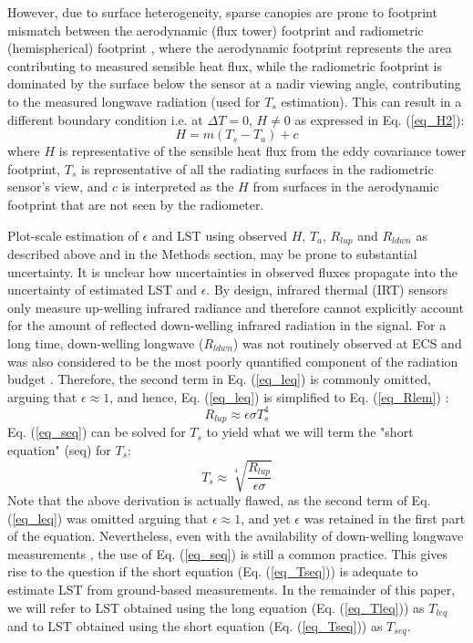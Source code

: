 \documentclass[fleqn,10pt]{wlscirep}
\begin{document}
However, due to surface heterogeneity, sparse canopies are prone to footprint mismatch between the aerodynamic (flux tower) footprint and radiometric (hemispherical) footprint \cite{chu2021representativeness,marcolla2018geometry,morillas2013using}, where the aerodynamic footprint represents the area contributing to measured sensible heat flux, while the radiometric footprint is dominated by the surface below the sensor at a nadir viewing angle, contributing to the measured longwave radiation (used for $T_{s}$ estimation). This can result in a different boundary condition i.e. at $\Delta T =0$, $H \not= 0$ as expressed in Eq. (\ref{eq_H2}): 
\begin{equation}\label{eq_H2}
H= m(T_{s} - T_{a}) +  c    
\end{equation}
where $H$ is representative of the sensible heat flux from the eddy covariance tower footprint, $T_{s}$ is representative of all the radiating surfaces in the radiometric sensor’s view, and $c$ is interpreted as the $H$ from surfaces in the aerodynamic footprint that are not seen by the radiometer. 

Plot-scale estimation of $\epsilon$ and LST using observed $H$, $T_{a}$, $R_{lup}$ and $R_{ldwn}$ as described above and in the Methods section, may be prone to substantial uncertainty. It is unclear how uncertainties in observed fluxes propagate into the uncertainty of estimated LST and $\epsilon$. By design, infrared thermal (IRT) sensors only measure up-welling infrared radiance and therefore cannot explicitly account for the amount of reflected down-welling infrared radiation in the signal. For a long time, down-welling longwave ($R_{ldwn}$) was not routinely observed at ECS \cite{wang2009evaluation} and was also considered to be the most poorly quantified component of the radiation budget \cite{trenberth2012tracking}. Therefore, the second term in Eq. (\ref{eq_leq}) is commonly omitted, arguing that $\epsilon\approx 1$, and hence, Eq. (\ref{eq_leq}) is simplified to Eq. (\ref{eq_Rlem}) \cite{crago2014use}:
\begin{equation}\label{eq_seq}
R_{lup} \approx  \epsilon \sigma T_{s}^{4}                
\end{equation} 
Eq. (\ref{eq_seq}) can be solved for $T_s$ to yield what we will term the "short equation" (seq) for $T_s$:
\begin{equation}\label{eq_Tseq}
T_{s} \approx \sqrt[4]{\frac{R_{lup}}{\epsilon \sigma}}
\end{equation} 
Note that the above derivation is actually flawed, as the second term of Eq. (\ref{eq_leq}) was omitted arguing that $\epsilon\approx 1$, and yet $\epsilon$ was retained in the first part of the equation. Nevertheless, even with the availability of down-welling longwave measurements \cite{stephens1995review}, the use of Eq. (\ref{eq_seq}) is still a common practice\cite{crago2014use,mallick2018bridging}. This gives rise to the question if the short equation (Eq. (\ref{eq_Tseq})) is adequate to estimate LST from ground-based measurements. In the remainder of this paper, we will refer to LST obtained using the long equation (Eq. (\ref{eq_Tleq})) as $T_{leq}$ and to LST obtained using the short equation (Eq. (\ref{eq_Tseq})) as $T_{seq}$.
\end{document}
